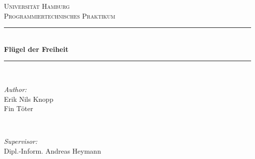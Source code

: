 \begin{titlepage}

\newcommand{\HRule}{\rule{\linewidth}{0.5mm}} %

\center %
 

\textsc{\LARGE Universität Hamburg}\\[1.5cm] %
\textsc{\Large Programmiertechnisches Praktikum}\\[0.5cm] %


\HRule \\[0.4cm]
{ \huge \bfseries Flügel der Freiheit}\\[0.4cm] %
\HRule \\[1.5cm]
 

\begin{minipage}{0.4\textwidth}
\begin{flushleft} \large
\emph{Author:}\\
Erik Nils Knopp\\
Fin Töter\\ 
\end{flushleft}
\end{minipage}
~
\begin{minipage}{0.4\textwidth}
\begin{flushright} \large
\emph{Supervisor:} \\
Dipl.-Inform. Andreas Heymann 
\end{flushright}
\end{minipage}\\[2cm]



\end{titlepage}
